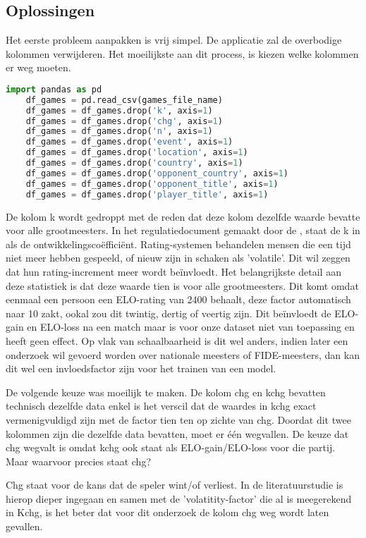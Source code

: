 \subsection{Oplossingen}

Het eerste probleem aanpakken is vrij simpel. De applicatie zal de overbodige kolommen verwijderen. Het moeilijkste aan dit process, is kiezen welke kolommen er weg moeten.
\begin{lstlisting}[language=Python]
    import pandas as pd
    df_games = pd.read_csv(games_file_name)
    df_games = df_games.drop('k', axis=1)
    df_games = df_games.drop('chg', axis=1)
    df_games = df_games.drop('n', axis=1)
    df_games = df_games.drop('event', axis=1)
    df_games = df_games.drop('location', axis=1)
    df_games = df_games.drop('country', axis=1)
    df_games = df_games.drop('opponent_country', axis=1)
    df_games = df_games.drop('opponent_title', axis=1)
    df_games = df_games.drop('player_title', axis=1)
\end{lstlisting}

De kolom k wordt gedroppt met de reden dat deze kolom dezelfde waarde bevatte voor alle grootmeesters. In het regulatiedocument gemaakt door de \textcite{FIDE2021}, staat de k in als de ontwikkelingscoëfficiënt. Rating-systemen behandelen mensen die een tijd niet meer hebben gespeeld, of nieuw zijn in schaken als 'volatile'. Dit wil zeggen dat hun rating-increment meer wordt beïnvloedt. Het belangrijkste detail aan deze statistiek is dat deze waarde tien is voor alle grootmeesters. Dit komt omdat eenmaal een persoon een ELO-rating van 2400 behaalt, deze factor automatisch naar 10 zakt, ookal zou dit twintig, dertig of veertig zijn. Dit beïnvloedt de ELO-gain en ELO-loss na een match maar is voor onze dataset niet van toepassing en heeft geen effect. Op vlak van schaalbaarheid is dit wel anders, indien later een onderzoek wil gevoerd worden over nationale meesters of FIDE-meesters, dan kan dit wel een invloedsfactor zijn voor het trainen van een model. 

De volgende keuze was moeilijk te maken. De kolom chg en kchg bevatten technisch dezelfde data enkel is het verscil dat de waardes in kchg exact vermenigvuldigd zijn met de factor tien ten op zichte van chg. Doordat dit twee kolommen zijn die dezelfde data bevatten, moet er één wegvallen. De keuze dat chg wegvalt is omdat kchg ook staat als ELO-gain/ELO-loss voor die partij. Maar waarvoor precies staat chg?

Chg staat voor de kans dat de speler wint/of verliest. In de literatuurstudie is hierop dieper ingegaan en samen met de 'volatitity-factor' die al is meegerekend in Kchg, is het beter dat voor dit onderzoek de kolom chg weg wordt laten gevallen.

